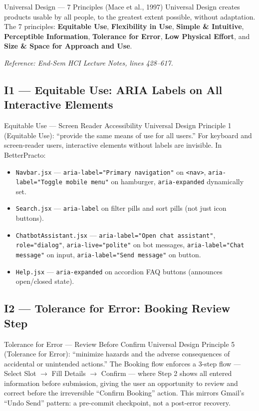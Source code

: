 \documentclass[12pt, a4paper]{article}
\begin{document}
\begin{hcibox}{Universal Design --- 7 Principles (Mace et al., 1997)}
Universal Design creates products usable by all people, to the greatest extent possible, without adaptation. The 7 principles: \textbf{Equitable Use}, \textbf{Flexibility in Use}, \textbf{Simple \& Intuitive}, \textbf{Perceptible Information}, \textbf{Tolerance for Error}, \textbf{Low Physical Effort}, and \textbf{Size \& Space for Approach and Use}.

\textit{Reference: End-Sem HCI Lecture Notes, lines 428--617.}
\end{hcibox}

\subsection{I1 --- Equitable Use: ARIA Labels on All Interactive Elements}

\begin{featurebox}{Equitable Use --- Screen Reader Accessibility}
Universal Design Principle 1 (Equitable Use): ``provide the same means of use for all users.'' For keyboard and screen-reader users, interactive elements without labels are invisible. In BetterPracto:
\begin{itemize}[leftmargin=1.5em, itemsep=0pt]
  \item \texttt{Navbar.jsx} --- \texttt{aria-label="Primary navigation"} on \texttt{<nav>}, \texttt{aria-label="Toggle mobile menu"} on hamburger, \texttt{aria-expanded} dynamically set.
  \item \texttt{Search.jsx} --- \texttt{aria-label} on filter pills and sort pills (not just icon buttons).
  \item \texttt{ChatbotAssistant.jsx} --- \texttt{aria-label="Open chat assistant"}, \texttt{role="dialog"}, \texttt{aria-live="polite"} on bot messages, \texttt{aria-label="Chat message"} on input, \texttt{aria-label="Send message"} on button.
  \item \texttt{Help.jsx} --- \texttt{aria-expanded} on accordion FAQ buttons (announces open/closed state).
\end{itemize}
\end{featurebox}

\subsection{I2 --- Tolerance for Error: Booking Review Step}

\begin{featurebox}{Tolerance for Error --- Review Before Confirm}
Universal Design Principle 5 (Tolerance for Error): ``minimize hazards and the adverse consequences of accidental or unintended actions.'' The Booking flow enforces a 3-step flow --- Select Slot $\to$ Fill Details $\to$ Confirm --- where Step 2 shows all entered information before submission, giving the user an opportunity to review and correct before the irreversible ``Confirm Booking'' action. This mirrors Gmail's ``Undo Send'' pattern: a pre-commit checkpoint, not a post-error recovery.
\end{featurebox}
\end{document}

